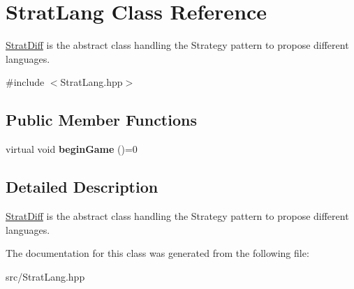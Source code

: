 \hypertarget{classStratLang}{\section{Strat\-Lang Class Reference}
\label{classStratLang}
}


\hyperlink{classStratDiff}{Strat\-Diff} is the abstract class handling the Strategy pattern to propose different languages.  




{\ttfamily \#include $<$Strat\-Lang.\-hpp$>$}

\subsection*{Public Member Functions}
\begin{DoxyCompactItemize}
\item 
\hypertarget{classStratLang_aa7a231de0ae7c735b16ae06d898e1141}{virtual void {\bfseries begin\-Game} ()=0}\label{classStratLang_aa7a231de0ae7c735b16ae06d898e1141}

\end{DoxyCompactItemize}


\subsection{Detailed Description}
\hyperlink{classStratDiff}{Strat\-Diff} is the abstract class handling the Strategy pattern to propose different languages. 

The documentation for this class was generated from the following file\-:\begin{DoxyCompactItemize}
\item 
src/Strat\-Lang.\-hpp\end{DoxyCompactItemize}

